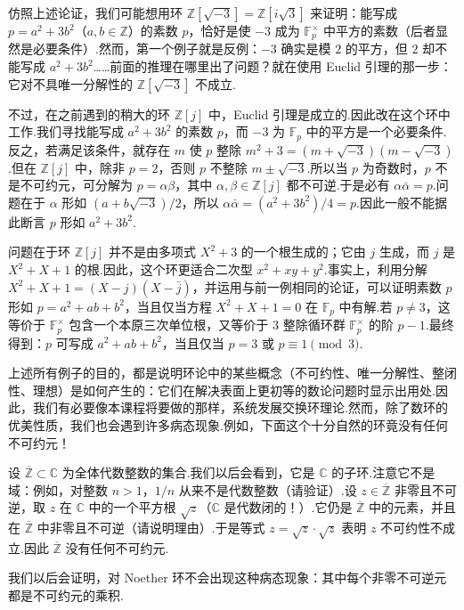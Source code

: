 \begin{example*}
仿照上述论证，我们可能想用环 $\mathbb Z[\sqrt{-3}]=\mathbb Z[i\sqrt3]$ 来证明：能写成 $p=a^2+3b^2$（$a,b\in\mathbb Z$）的素数 $p$，恰好是使 $-3$ 成为 $\mathbb F_p^\times$ 中平方的素数（后者显然是必要条件）.然而，第一个例子就是反例：$-3$ 确实是模 $2$ 的平方，但 $2$ 却不能写成 $a^2+3b^2$……前面的推理在哪里出了问题？就在使用 Euclid 引理的那一步：它对不具唯一分解性的 $\mathbb Z[\sqrt{-3}]$ 不成立.

不过，在之前遇到的稍大的环 $\mathbb Z[j]$ 中，Euclid 引理是成立的.因此改在这个环中工作.我们寻找能写成 $a^2+3b^2$ 的素数 $p$，而 $-3$ 为 $\mathbb F_p$ 中的平方是一个必要条件.反之，若满足该条件，就存在 $m$ 使 $p$ 整除 $m^2+3=(m+\sqrt{-3})(m-\sqrt{-3})$.但在 $\mathbb Z[j]$ 中，除非 $p=2$，否则 $p$ 不整除 $m\pm\sqrt{-3}$.所以当 $p$ 为奇数时，$p$ 不是不可约元，可分解为 $p=\alpha\beta$，其中 $\alpha,\beta\in\mathbb Z[j]$ 都不可逆.于是必有 $\alpha\bar\alpha=p$.问题在于 $\alpha$ 形如 $(a+b\sqrt{-3})/2$，所以 $\alpha\bar\alpha=(a^2+3b^2)/4=p$.因此一般不能据此断言 $p$ 形如 $a^2+3b^2$.

问题在于环 $\mathbb Z[j]$ 并不是由多项式 $X^2+3$ 的一个根生成的；它由 $j$ 生成，而 $j$ 是 $X^2+X+1$ 的根.因此，这个环更适合二次型 $x^2+xy+y^2$.事实上，利用分解 $X^2+X+1=(X-j)(X-\bar j)$，并运用与前一例相同的论证，可以证明素数 $p$ 形如 $p=a^2+ab+b^2$，当且仅当方程 $X^2+X+1=0$ 在 $\mathbb F_p$ 中有解.若 $p\ne3$，这等价于 $\mathbb F_p^\times$ 包含一个本原三次单位根，又等价于 $3$ 整除循环群 $\mathbb F_p^\times$ 的阶 $p-1$.最终得到：$p$ 可写成 $a^2+ab+b^2$，当且仅当 $p=3$ 或 $p\equiv1\pmod3$.
\end{example*}
上述所有例子的目的，都是说明环论中的某些概念（不可约性、唯一分解性、整闭性、理想）是如何产生的：它们在解决表面上更初等的数论问题时显示出用处.因此，我们有必要像本课程将要做的那样，系统发展交换环理论.然而，除了数环的优美性质，我们也会遇到许多病态现象.例如，下面这个十分自然的环竟没有任何不可约元！
\begin{example*}
设 $\overline{\mathbb Z}\subset\mathbb C$ 为全体代数整数的集合.我们以后会看到，它是 $\mathbb C$ 的子环.注意它不是域：例如，对整数 $n>1$，$1/n$ 从来不是代数整数（请验证）.设 $z\in\overline{\mathbb Z}$ 非零且不可逆，取 $z$ 在 $\mathbb C$ 中的一个平方根 $\sqrt z$（$\mathbb C$ 是代数闭的！）.它仍是 $\overline{\mathbb Z}$ 中的元素，并且在 $\overline{\mathbb Z}$ 中非零且不可逆（请说明理由）.于是等式 $z=\sqrt z\cdot\sqrt z$ 表明 $z$ 不可约性不成立.因此 $\overline{\mathbb Z}$ 没有任何不可约元.
\end{example*}
我们以后会证明，对 Noether 环不会出现这种病态现象：其中每个非零不可逆元都是不可约元的乘积.

